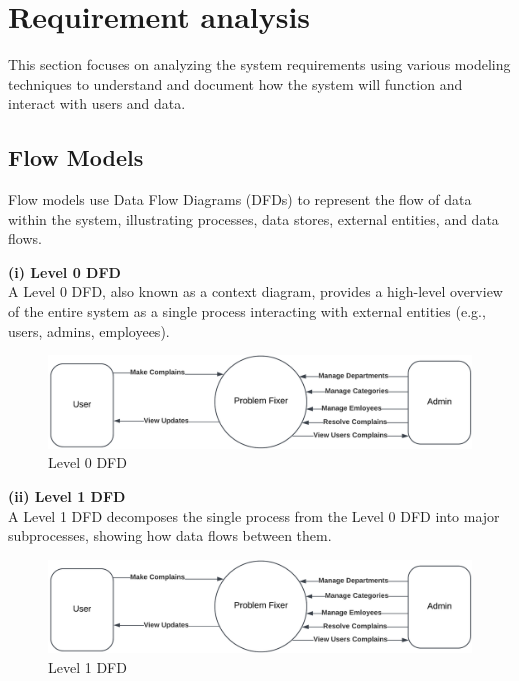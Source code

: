 \documentclass[a4paper,12pt]{article}
\begin{document}
\setcounter{page}{1} 

\section{Requirement analysis}
This section focuses on analyzing the system requirements using various modeling techniques to understand and document how the system will function and interact with users and data.

\subsection{Flow Models}
Flow models use Data Flow Diagrams (DFDs) to represent the flow of data within the system, illustrating processes, data stores, external entities, and data flows.

\noindent \textbf{(i) Level 0 DFD} \\
A Level 0 DFD, also known as a context diagram, provides a high-level overview of the entire system as a single process interacting with external entities (e.g., users, admins, employees). 
\begin{figure}[H]
    \centering
    \includegraphics[width=1\linewidth]{photos/dfd-0.png}
    \caption{Level 0 DFD}
    \label{fig:enter-label}
\end{figure}

\noindent \textbf{(ii) Level 1 DFD} \\
A Level 1 DFD decomposes the single process from the Level 0 DFD into major subprocesses, showing how data flows between them. 
\begin{figure}[H]
    \centering
    \includegraphics[width=1\linewidth]{photos/dfd-0.png}
    \caption{Level 1 DFD}
    \label{fig:enter-label}
\end{figure}
\end{document}
